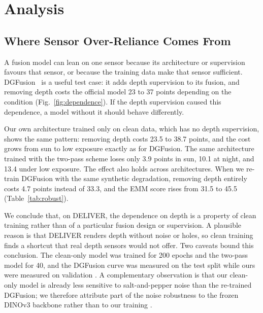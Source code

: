 \section{Analysis}\label{sec:analysis}


\subsection{Where Sensor Over-Reliance Comes From}
A fusion model can lean on one sensor because its architecture or supervision favours that sensor, or because the training data make that sensor sufficient. DGFusion~\cite{dgfusion2026} is a useful test case: it adds depth supervision to its fusion, and removing depth costs the official model 23 to 37 points depending on the condition (Fig.~\ref{fig:dependence}). If the depth supervision caused this dependence, a model without it should behave differently.

Our own architecture trained only on clean data, which has no depth supervision, shows the same pattern: removing depth costs 23.5 to 38.7 points, and the cost grows from sun to low exposure exactly as for DGFusion. The same architecture trained with the two-pass scheme loses only 3.9 points in sun, 10.1 at night, and 13.4 under low exposure. The effect also holds across architectures. When we re-train DGFusion with the same synthetic degradation, removing depth entirely costs 4.7 points instead of 33.3, and the EMM score rises from 31.5 to 45.5 (Table~\ref{tab:robust}).

We conclude that, on DELIVER, the dependence on depth is a property of clean training rather than of a particular fusion design or supervision. A plausible reason is that DELIVER renders depth without noise or holes, so clean training finds a shortcut that real depth sensors would not offer. Two caveats bound this conclusion. The clean-only model was trained for 200 epochs and the two-pass model for 40, and the DGFusion curve was measured on the test split while ours were measured on validation . A complementary observation is that our clean-only model is already less sensitive to salt-and-pepper noise than the re-trained DGFusion; we therefore attribute part of the noise robustness to the frozen DINOv3 backbone rather than to our training .


